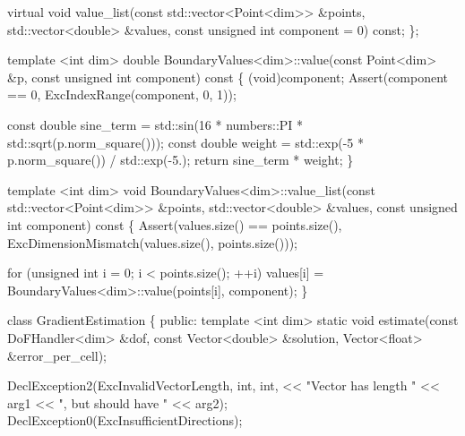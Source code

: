 \begin{DoxyCodeInclude}
    \textcolor{keyword}{virtual} \textcolor{keywordtype}{void} value\_list(\textcolor{keyword}{const} std::vector<Point<dim>> &points,
                            std::vector<double> &values,
                            \textcolor{keyword}{const} \textcolor{keywordtype}{unsigned} \textcolor{keywordtype}{int} component = 0) \textcolor{keyword}{const};
\};


\textcolor{keyword}{template} <\textcolor{keywordtype}{int} dim>
\textcolor{keywordtype}{double} BoundaryValues<dim>::value(\textcolor{keyword}{const} Point<dim> &p,
                                  \textcolor{keyword}{const} \textcolor{keywordtype}{unsigned} \textcolor{keywordtype}{int} component)\textcolor{keyword}{ const}
\textcolor{keyword}{}\{
    (void)component;
    Assert(component == 0, ExcIndexRange(component, 0, 1));

    \textcolor{keyword}{const} \textcolor{keywordtype}{double} sine\_term =
        std::sin(16 * numbers::PI * std::sqrt(p.norm\_square()));
    \textcolor{keyword}{const} \textcolor{keywordtype}{double} weight = std::exp(-5 * p.norm\_square()) / std::exp(-5.);
    \textcolor{keywordflow}{return} sine\_term * weight;
\}


\textcolor{keyword}{template} <\textcolor{keywordtype}{int} dim>
\textcolor{keywordtype}{void} BoundaryValues<dim>::value\_list(\textcolor{keyword}{const} std::vector<Point<dim>> &points,
                                     std::vector<double> &values,
                                     \textcolor{keyword}{const} \textcolor{keywordtype}{unsigned} \textcolor{keywordtype}{int} component)\textcolor{keyword}{ const}
\textcolor{keyword}{}\{
    Assert(values.size() == points.size(),
           ExcDimensionMismatch(values.size(), points.size()));

    \textcolor{keywordflow}{for} (\textcolor{keywordtype}{unsigned} \textcolor{keywordtype}{int} i = 0; i < points.size(); ++i)
        values[i] = BoundaryValues<dim>::value(points[i], component);
\}



\textcolor{keyword}{class }GradientEstimation \{
\textcolor{keyword}{public}:
    \textcolor{keyword}{template} <\textcolor{keywordtype}{int} dim>
    \textcolor{keyword}{static} \textcolor{keywordtype}{void} estimate(\textcolor{keyword}{const} DoFHandler<dim> &dof,
                         \textcolor{keyword}{const} Vector<double> &solution,
                         Vector<float> &error\_per\_cell);

    DeclException2(ExcInvalidVectorLength, \textcolor{keywordtype}{int}, \textcolor{keywordtype}{int},
                   << \textcolor{stringliteral}{"Vector has length "} << arg1 << \textcolor{stringliteral}{", but should have "}
                   << arg2);
    DeclException0(ExcInsufficientDirections);


\end{DoxyCodeInclude}
